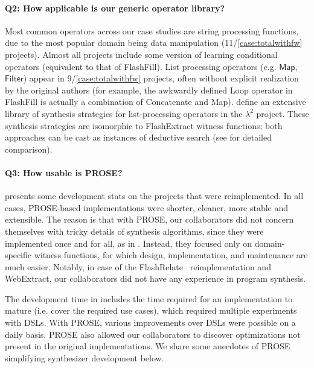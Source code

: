 \paragraph{Q2: How applicable is our generic operator library?}
Most common operators across our case studies are string processing functions, due to the most popular domain being data
manipulation (11/\ref*{case:totalwithfw} projects).
Almost all projects include some version of learning conditional operators (equivalent to that of FlashFill).
List processing operators (e.g. $\mathsf{Map}$, $\mathsf{Filter}$) appear in 9/\ref*{case:totalwithfw} projects, often
without explicit realization by the original authors (for example, the awkwardly defined \textsf{Loop} operator in
FlashFill is actually a combination of \textsf{Concatenate} and \textsf{Map}).
\citet{pldi15:swarat} define an extensive library of synthesis strategies for list-processing operators in the
$\lambda^2$ project.
These synthesis strategies are isomorphic to FlashExtract witness functions; both approaches can be cast as instances of
deductive search (see  for detailed comparison).

\paragraph{Q3: How usable is PROSE?}
 presents some development stats on the projects that were reimplemented.
In all cases, PROSE-based implementations were shorter, cleaner, more stable and extensible.
The reason is that with PROSE, our collaborators did not concern themselves with tricky details of synthesis
algorithms, since they were implemented once and for all, as in .
Instead, they focused only on domain-specific witness functions, for which design, implementation, and maintenance are
much easier.
Notably, in case of the FlashRelate~\cite{flashrelate} reimplementation and \textsf{WebExtract}, our collaborators did
not have any experience in program synthesis.

The development time in  includes the time required for an implementation to mature
(i.e. cover the required use cases), which required multiple experiments with DSLs.
With PROSE, various improvements over DSLs were possible on a daily basis.
PROSE also allowed our collaborators to discover optimizations not present in the original implementations.
We share some anecdotes of PROSE simplifying synthesizer development below.

